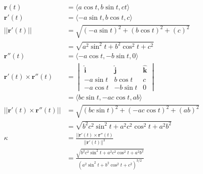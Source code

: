 \documentclass{article}
\begin{document}
\begin{align*}
  \mathbf{r}(t)                             & = \langle a \cos t, b \sin t, c t \rangle                                                                  \\
  \mathbf{r}'(t)                            & = \langle -a \sin t, b \cos t, c \rangle                                                                   \\
  ||\mathbf{r}'(t)||                        & = \sqrt{(-a \sin t)^2 + (b \cos t)^2 + (c)^2}                                                              \\
                                            & = \sqrt{a^2 \sin^2 t + b^2 \cos^2 t + c^2}                                                                 \\
  \mathbf{r}''(t)                           & = \langle -a \cos t, -b \sin t, 0 \rangle                                                                  \\
  \mathbf{r}'(t) \times \mathbf{r}''(t)     & = \begin{vmatrix}
                                                  \hat{\mathbf{i}} & \hat{\mathbf{j}} & \hat{\mathbf{k}} \\
                                                  -a \sin t        & b \cos t         & c                \\
                                                  -a \cos t        & -b \sin t        & 0
                                                \end{vmatrix}         \\
                                            & = \langle b c \sin t, -a c \cos t, a b \rangle                                                             \\
  ||\mathbf{r}'(t) \times \mathbf{r}''(t)|| & = \sqrt{(b c \sin t)^2 + (-a c \cos t)^2 + (a b)^2}                                                        \\
                                            & = \sqrt{b^2 c^2 \sin^2 t + a^2 c^2 \cos^2 t + a^2 b^2}                                                     \\
  \kappa                                    & = \frac{||\mathbf{r}'(t) \times \mathbf{r}''(t)}{||\mathbf{r}'(t)||^3}                                     \\
                                            & = \frac{\sqrt{b^2 c^2 \sin^2 t + a^2 c^2 \cos^2 t + a^2 b^2}}{(a^2 \sin^2 t + b^2 \cos^2 t + c^2)^{3 / 2}}
\end{align*}
\end{document}
